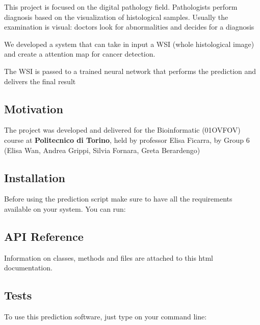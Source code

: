 This project is focused on the digital pathology field. Pathologists perform diagnosis based on the visualization of histological samples. Usually the examination is visual\+: doctors look for abnormalities and decides for a diagnosis

We developed a system that can take in input a W\+SI (whole histological image) and create a attention map for cancer detection.

The W\+SI is passed to a trained neural network that performs the prediction and delivers the final result

\subsection*{Motivation}

The project was developed and delivered for the Bioinformatic (01O\+V\+F\+OV) course at {\bfseries{Politecnico di Torino}}, held by professor Elisa Ficarra, by Group 6 (Elisa Wan, Andrea Grippi, Silvia Fornara, Greta Berardengo)

\subsection*{Installation}

Before using the prediction script make sure to have all the requirements available on your system. You can run\+:


\begin{DoxyCode}{0}
\end{DoxyCode}


\subsection*{A\+PI Reference}

Information on classes, methods and files are attached to this html documentation.

\subsection*{Tests}

To use this prediction software, just type on your command line\+:


\begin{DoxyCode}{0}
\end{DoxyCode}



